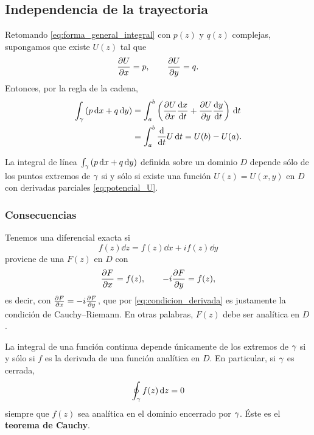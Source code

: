 \subsection{Independencia de la trayectoria}
\label{subsec:independencia_trayectoria}

Retomando \eqref{eq:forma_general_integral} con $p(z)$ y $q(z)$ complejas,
supongamos que existe $U(z)$ tal que
\begin{equation}
  \label{eq:potencial_U}
  \frac{\partial U}{\partial x}=p,
  \qquad
  \frac{\partial U}{\partial y}=q .
\end{equation}
Entonces, por la regla de la cadena,
\begin{equation}
  \label{eq:integral_exacta}
  \begin{aligned}
    \int_{\gamma}\left( p\,\mathrm{d} x+q\,\mathrm{d} y \right)
      &=\int_{a}^{b}\left( \frac{\partial U}{\partial x}\frac{\mathrm{d}x}{\mathrm{d}t}
        +\frac{\partial U}{\partial y}\frac{\mathrm{d}y}{\mathrm{d}t} \right)\,\mathrm{d} t\\
      &=\int_{a}^{b}\frac{\mathrm{d}}{\mathrm{d}t}U\,\mathrm{d} t=U(b)-U(a).
  \end{aligned}
\end{equation}

\begin{teorema}
  \label{teo:independencia}
  La integral de l\'inea $\int_{\gamma}\left( p\,\mathrm{d} x+q\,\mathrm{d} y \right)$ definida sobre un
  dominio $D$ depende s\'olo de los puntos extremos de $\gamma$ si y s\'olo si
  existe una funci\'on $U(z)=U(x,y)$ en $D$ con derivadas parciales
  \eqref{eq:potencial_U}.
\end{teorema}

\subsubsection{Consecuencias}
\label{subsubsec:consecuencias_independencia}

Tenemos una diferencial exacta si
\begin{equation}
  \label{eq:diferencial_exacta}
  f(z)\dd z=f(z)\dd x+if(z)\dd y
\end{equation}
proviene de una $F(z)$ en $D$ con
\begin{equation}
  \label{eq:F_parciales}
  \frac{\partial F}{\partial x}=f(z),
  \qquad
  -i\frac{\partial F}{\partial y}=f(z),
\end{equation}
es decir, con $\frac{\partial F}{\partial x}=-i\frac{\partial F}{\partial y}$, que por
\eqref{eq:condicion_derivada} es justamente la condici\'on de
Cauchy--Riemann. En otras palabras, $F(z)$ debe ser anal\'itica en $D$.

\begin{observacion}
  La integral de una funci\'on continua depende \'unicamente de los extremos
  de $\gamma$ si y s\'olo si $f$ es la derivada de una funci\'on anal\'itica en
  $D$. En particular, si $\gamma$ es cerrada,
  \begin{equation}
    \label{eq:integral_cerrada_nula}
    \oint_{\gamma}f(z)\,\mathrm{d} z=0
  \end{equation}
  siempre que $f(z)$ sea anal\'itica en el dominio encerrado por $\gamma$. \'Este
  es el \textbf{teorema de Cauchy}.
\end{observacion}


